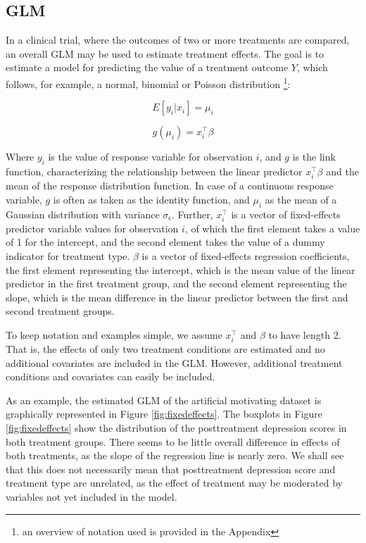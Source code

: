 \documentclass[nobf,doc]{apa}
\begin{document}
\subsection{GLM}
In a clinical trial, where the outcomes of two or more treatments are compared, an overall GLM may be used to estimate treatment effects. The goal is to estimate a model for predicting the value of a treatment outcome $Y$, which follows, for example, a normal, binomial or Poisson distribution \footnote{ an overview of notation used is provided in the Appendix}:

\begin{equation}
\label{eq:expected_value}
	E[y_i | x_i] = \mu_i 
\end{equation}

\begin{equation}
\label{eq:fixedeffects}
	g(\mu_{i}) = x_{i}^{\top}\beta 
\end{equation}

Where $y_i$ is the value of response variable for observation $i$, and $g$ is the link function, characterizing the relationship between the linear predictor $x_{i}^{\top}\beta$ and the mean of the response distribution function. In case of a continuous response variable, $g$ is often as taken as the identity function, and $\mu_{i}$ as the mean of a Gaussian distribution with variance $\sigma_{\epsilon}$. Further, $x_{i}^{\top}$ is a vector of fixed-effects predictor variable values for observation $i$, of which the first element takes a value of 1 for the intercept, and the second element takes the value of a dummy indicator for treatment type. $\beta$ is a vector of fixed-effects regression coefficients, the first element representing the intercept, which is the mean value of the linear predictor in the first treatment group, and the second element representing the slope, which is the mean difference in the linear predictor between the first and second treatment groups.  

To keep notation and examples simple, we assume $x_{i}^{\top}$ and $\beta$ to have length 2. That is, the effects of only two treatment conditions are estimated and no additional covariates are included in the GLM. However, additional treatment conditions and covariates can easily be included.

As an example, the estimated GLM of the artificial motivating dataset is graphically represented in Figure \ref{fig:fixedeffects}. The boxplots in Figure \ref{fig:fixedeffects} show the distribution of the posttreatment depression scores in both treatment groups. There seems to be little overall difference in effects of both treatments, as the slope of the regression line is nearly zero. We shall see that this does not necessarily mean that posttreatment depression score and treatment type are unrelated, as the effect of treatment may be moderated by variables not yet included in the model.
\end{document}
